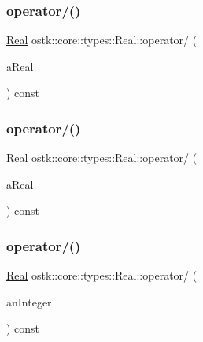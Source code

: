 \mbox{\label{classostk_1_1core_1_1types_1_1_real_a4a2298c3fe615be53a42195304f0c9fd}} 
\subsubsection{\texorpdfstring{operator/()}{operator/()}\hspace{0.1cm}{\footnotesize\ttfamily [1/3]}}
{\footnotesize\ttfamily \hyperlink{classostk_1_1core_1_1types_1_1_real}{Real} ostk\+::core\+::types\+::\+Real\+::operator/ (\begin{DoxyParamCaption}\item[{const \hyperlink{classostk_1_1core_1_1types_1_1_real}{Real} \&}]{a\+Real }\end{DoxyParamCaption}) const}

\mbox{\label{classostk_1_1core_1_1types_1_1_real_a2827a01c00cae0a3f0a887a68f5dda33}} 
\subsubsection{\texorpdfstring{operator/()}{operator/()}\hspace{0.1cm}{\footnotesize\ttfamily [2/3]}}
{\footnotesize\ttfamily \hyperlink{classostk_1_1core_1_1types_1_1_real}{Real} ostk\+::core\+::types\+::\+Real\+::operator/ (\begin{DoxyParamCaption}\item[{const \hyperlink{classostk_1_1core_1_1types_1_1_real_aa26f796c30b514c98d573f82e3b02296}{Real\+::\+Value\+Type} \&}]{a\+Real }\end{DoxyParamCaption}) const}

\mbox{\label{classostk_1_1core_1_1types_1_1_real_a8086b2a718a3fdf5b0aa494a282f1dfe}} 
\subsubsection{\texorpdfstring{operator/()}{operator/()}\hspace{0.1cm}{\footnotesize\ttfamily [3/3]}}
{\footnotesize\ttfamily \hyperlink{classostk_1_1core_1_1types_1_1_real}{Real} ostk\+::core\+::types\+::\+Real\+::operator/ (\begin{DoxyParamCaption}\item[{const \hyperlink{classostk_1_1core_1_1types_1_1_integer}{Integer} \&}]{an\+Integer }\end{DoxyParamCaption}) const}

